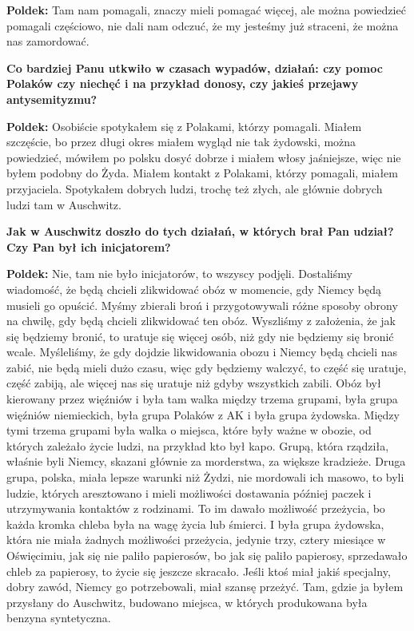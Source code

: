 \begin{otherlanguage}{polish}
\textbf{Poldek:} Tam nam pomagali, znaczy mieli pomagać więcej, ale można powiedzieć pomagali częściowo, nie dali nam odczuć, że my jesteśmy już straceni, że można nas zamordować.

\textbf{Co bardziej Panu utkwiło w czasach wypadów, działań: czy pomoc Polaków czy niechęć i na przykład donosy, czy jakieś przejawy antysemityzmu?}

\textbf{Poldek:} Osobiście spotykałem się z Polakami, którzy pomagali. Miałem szczęście, bo przez długi okres miałem wygląd nie tak żydowski, można powiedzieć, mówiłem po polsku dosyć dobrze i miałem włosy jaśniejsze, więc nie byłem podobny do Żyda. Miałem kontakt z Polakami, którzy pomagali, miałem przyjaciela. Spotykałem dobrych ludzi, trochę też złych, ale głównie dobrych ludzi tam w Auschwitz.
 
\textbf{Jak w Auschwitz doszło do tych działań, w których brał Pan udział? Czy Pan był ich inicjatorem?}
  
\textbf{Poldek:} Nie, tam nie było inicjatorów, to wszyscy podjęli. Dostaliśmy wiadomość, że będą chcieli zlikwidować obóz w momencie, gdy Niemcy będą musieli go opuścić. Myśmy zbierali broń i przygotowywali różne sposoby obrony na chwilę, gdy będą chcieli zlikwidować ten obóz. Wyszliśmy z założenia, że jak się będziemy bronić, to uratuje się więcej osób, niż gdy nie będziemy się bronić wcale. Myśleliśmy, że gdy dojdzie likwidowania obozu i Niemcy będą chcieli nas zabić, nie będą mieli dużo czasu, więc gdy będziemy walczyć, to część się uratuje, część zabiją, ale więcej nas się uratuje niż gdyby wszystkich zabili. Obóz był kierowany przez więźniów i była tam walka między trzema grupami, była grupa więźniów niemieckich, była grupa Polaków z AK i była grupa żydowska. Między tymi trzema grupami była walka o miejsca, które były ważne w obozie, od których zależało życie ludzi, na przykład kto był kapo. Grupą, która rządziła, właśnie byli Niemcy, skazani głównie za morderstwa, za większe kradzieże. Druga grupa, polska, miała lepsze warunki niż Żydzi, nie mordowali ich masowo, to byli ludzie, których aresztowano i mieli możliwości dostawania później paczek i utrzymywania kontaktów z rodzinami. To im dawało możliwość przeżycia, bo każda kromka chleba była na wagę życia lub śmierci. I była grupa żydowska, która nie miała żadnych możliwości przeżycia, jedynie trzy, cztery miesiące w Oświęcimiu, jak się nie paliło papierosów, bo jak się paliło papierosy, sprzedawało chleb za papierosy, to życie się jeszcze skracało. Jeśli ktoś miał jakiś specjalny, dobry zawód, Niemcy go potrzebowali, miał szansę przeżyć. Tam, gdzie ja byłem przysłany do Auschwitz, budowano miejsca, w których produkowana była benzyna syntetyczna. 


\end{otherlanguage}
